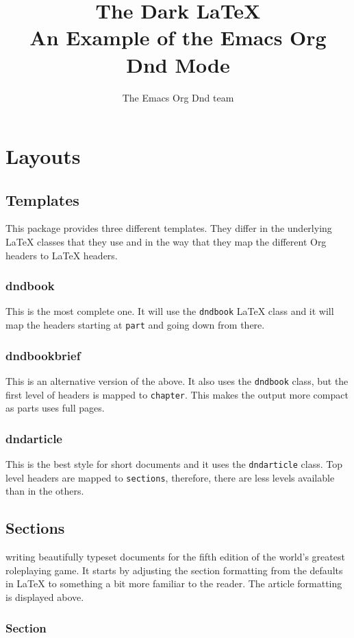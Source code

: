 \documentclass[10pt,twoside,twocolumn,openany,bg=full,notitlepage,nodeprecatedcode]{dndbook}
\author{The Emacs Org Dnd team}
\date{}
\title{The Dark \LaTeX\\\medskip
\large An Example of the Emacs Org Dnd Mode}
\begin{document}
\maketitle
\setcounter{tocdepth}{2}
{\let\clearpage\relax \tableofcontents}

\part{Layouts}
\label{sec:org26478f4}
\chapter{Templates}
\label{sec:org6a400db}
This package provides three different templates. They differ in the underlying \LaTeX{} classes that they use and in the way that they map the different Org headers to \LaTeX{} headers.
\section{dndbook}
\label{sec:orgd7de797}
This is the most complete one. It will use the \texttt{dndbook} \LaTeX{} class and it will map the headers starting at \texttt{part} and going down from there.
\section{dndbookbrief}
\label{sec:org1f8f396}
This is an alternative version of the above. It also uses the \texttt{dndbook} class, but the first level of headers is mapped to \texttt{chapter}. This makes the output more compact as parts uses full pages.
\section{dndarticle}
\label{sec:orgbb29c25}
This is the best style for short documents and it uses the \texttt{dndarticle} class. Top level headers are mapped to \texttt{sections}, therefore, there are less levels available than in the others.
\chapter{Sections}
\label{sec:org97ad316}
 writing beautifully typeset documents for the fifth edition of the world's greatest roleplaying game. It starts by adjusting the section formatting from the defaults in \LaTeX{} to something a bit more familiar to the reader. The article formatting is displayed above.
\section{Section}
\label{sec:org3d5288a}
\end{document}
